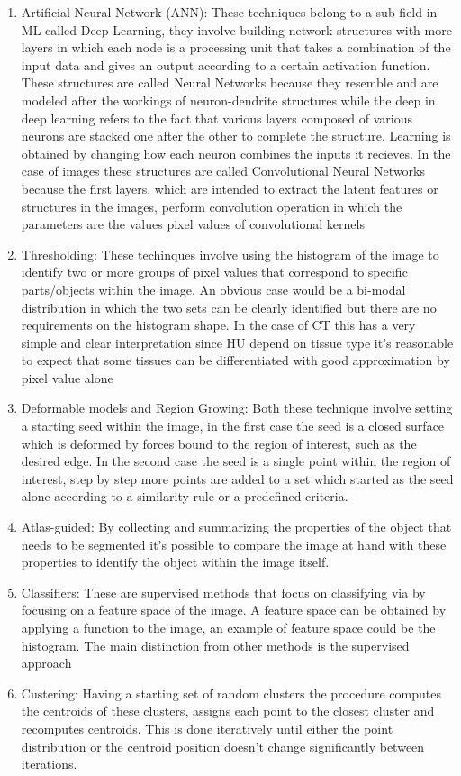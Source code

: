 \begin{enumerate}
\item Artificial Neural Network (ANN): These techniques belong to a sub-field in ML called Deep Learning, they involve building network structures with more layers in which each node is a processing unit that takes a combination of the input data and gives an output according to a certain activation function. These structures are called Neural Networks because they resemble and are modeled after the workings of neuron-dendrite structures while the deep in deep learning refers to the fact that various layers composed of various neurons are stacked one after the other to complete the structure. Learning is obtained by changing how each neuron combines the inputs it recieves. In the case of images these structures are called Convolutional Neural Networks because the first layers, which are intended to extract the latent features or structures in the images, perform convolution operation in which the parameters are the values pixel values of convolutional kernels
\item Thresholding: These techinques involve using the histogram of the image to identify two or more groups of pixel values that correspond to specific parts/objects within the image. An obvious case would be a bi-modal distribution in which the two sets can be clearly identified but there are no requirements on the histogram shape.  In the case of CT this has a very simple and clear interpretation since HU depend on tissue type it's reasonable to expect that some tissues can be differentiated with good approximation by pixel value alone
\item Deformable models and Region Growing: Both these technique involve setting a starting seed within the image, in the first case the seed is a closed surface which is deformed by forces bound to the region of interest, such as the desired edge. In the second case the seed is a single point within the region of interest, step by step more points are added to a set which started as the seed alone according to a similarity rule  or a predefined criteria.
\item Atlas-guided: By collecting and summarizing the properties of the object that needs to be segmented it's possible to compare the image at hand with these properties to identify the object within the image itself.
\item Classifiers: These are supervised methods that focus on classifying via by focusing on a feature space of the image. A feature space can be obtained by applying a function to the image, an example of feature space could be the histogram. The main distinction from other methods is the supervised approach
\item Custering: Having a starting set of random clusters the procedure computes the centroids of these clusters, assigns each point to the closest cluster and recomputes centroids. This is done iteratively until either the point distribution or the centroid position doesn't change significantly between iterations.
\end{enumerate}


